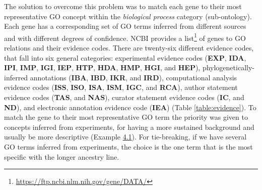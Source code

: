 The solution to overcome this problem was to match each gene to their most representative GO concept within the \textit{biological process} category (sub-ontology). Each gene has a corresponding set of GO terms inferred from different sources and with different degrees of confidence. NCBI provides a list\footnote{\url{https://ftp.ncbi.nlm.nih.gov/gene/DATA/}} of genes to GO relations and their evidence codes. There are twenty-six different evidence codes, that fall into six general categories: experimental evidence codes (\textbf{EXP}, \textbf{IDA}, \textbf{IPI}, \textbf{IMP}, \textbf{IGI}, \textbf{IEP}, \textbf{HTP}, \textbf{HDA}, \textbf{HMP}, \textbf{HGI}, and \textbf{HEP}), phylogenetically-inferred annotations (\textbf{IBA}, \textbf{IBD}, \textbf{IKR}, and \textbf{IRD}), computational analysis evidence codes (\textbf{ISS}, \textbf{ISO}, \textbf{ISA}, \textbf{ISM}, \textbf{IGC}, and \textbf{RCA}), author statement evidence codes (\textbf{TAS}, and \textbf{NAS}), curator statement evidence codes (\textbf{IC}, and \textbf{ND}), and electronic annotation evidence code (\textbf{IEA}) (Table \ref{table:evidence}). To match the gene to their most representative GO term the priority was given to concepts inferred from experiments, for having a more sustained background and usually be more descriptive (Example \hyperlink{ex4.1}{4.1}). For tie-breaking, if we have several GO terms inferred from experiments, the choice is the one term that is the most specific with the longer ancestry line.


